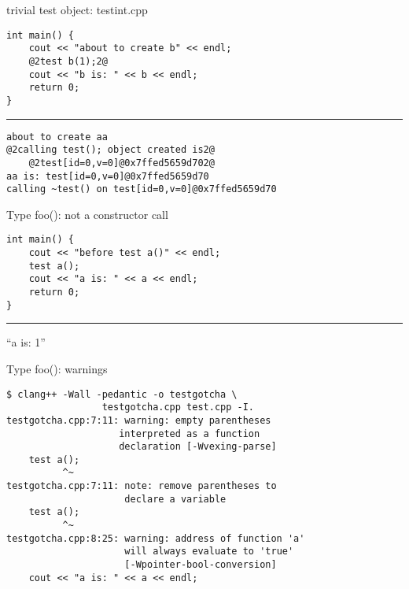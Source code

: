 \begin{frame}[fragile,label=usingTest2]{trivial test object: testint.cpp}
\begin{lstlisting}
int main() {
    cout << "about to create b" << endl;
    @2test b(1);2@
    cout << "b is: " << b << endl;
    return 0;
}
\end{lstlisting}
\hrule
\begin{lstlisting}
about to create aa
@2calling test(); object created is2@
    @2test[id=0,v=0]@0x7ffed5659d702@
aa is: test[id=0,v=0]@0x7ffed5659d70
calling ~test() on test[id=0,v=0]@0x7ffed5659d70
\end{lstlisting}
\end{frame}

\begin{frame}[fragile,label=gotcha]{Type foo(): not a constructor call}
\begin{lstlisting}
int main() {
    cout << "before test a()" << endl;
    test a();
    cout << "a is: " << a << endl;
    return 0;
}
\end{lstlisting}
\hrule
``a is: 1''
\end{frame}

\begin{frame}[fragile,label=gotchaWarnings]{Type foo(): warnings}
\begin{lstlisting}
$ clang++ -Wall -pedantic -o testgotcha \
                 testgotcha.cpp test.cpp -I.
testgotcha.cpp:7:11: warning: empty parentheses
                    interpreted as a function
                    declaration [-Wvexing-parse]
    test a();
          ^~
testgotcha.cpp:7:11: note: remove parentheses to
                     declare a variable
    test a();
          ^~
testgotcha.cpp:8:25: warning: address of function 'a'
                     will always evaluate to 'true'
                     [-Wpointer-bool-conversion]
    cout << "a is: " << a << endl;
\end{lstlisting}
\end{frame}

